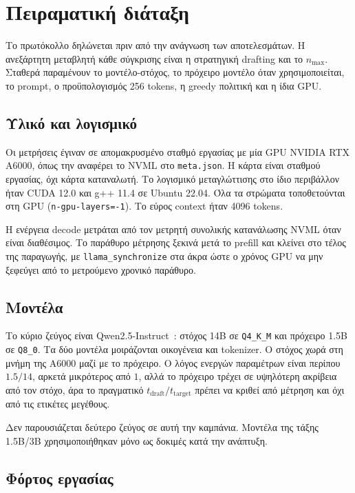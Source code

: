 \documentclass[a4paper,12pt]{report}
\theoremstyle{plain}
\theoremstyle{definition}
\theoremstyle{remark}
\begin{document}
\chapter{Πειραματική διάταξη}
\label{ch:setup}

Το πρωτόκολλο δηλώνεται πριν από την ανάγνωση των αποτελεσμάτων. Η ανεξάρτητη
μεταβλητή κάθε σύγκρισης είναι η στρατηγική drafting και το \(n_{\max}\).
Σταθερά παραμένουν το μοντέλο-στόχος, το πρόχειρο μοντέλο όταν χρησιμοποιείται,
το prompt, ο προϋπολογισμός 256 tokens, η greedy πολιτική και η ίδια GPU.

\section{Υλικό και λογισμικό}
\label{sec:hardware}

Οι μετρήσεις έγιναν σε απομακρυσμένο σταθμό εργασίας με μία GPU NVIDIA RTX
A6000, όπως την αναφέρει το NVML στο \texttt{meta.json}. Η κάρτα είναι
σταθμού εργασίας, όχι κάρτα καταναλωτή. Το λογισμικό μεταγλώττισης στο ίδιο
περιβάλλον ήταν CUDA 12.0 και g++ 11.4 σε Ubuntu 22.04. Όλα τα στρώματα
τοποθετούνται στη GPU (\texttt{n-gpu-layers=-1}). Το εύρος context ήταν 4096
tokens.

Η ενέργεια decode μετράται από τον μετρητή συνολικής κατανάλωσης NVML όταν
είναι διαθέσιμος. Το παράθυρο μέτρησης ξεκινά μετά το prefill και κλείνει
στο τέλος της παραγωγής, με \texttt{llama\_synchronize} στα άκρα ώστε ο
χρόνος GPU να μην ξεφεύγει από το μετρούμενο χρονικό παράθυρο.

\section{Μοντέλα}

Το κύριο ζεύγος είναι Qwen2.5-Instruct~\cite{qwen2p5}: στόχος 14B σε
\texttt{Q4\_K\_M} και πρόχειρο 1.5B σε \texttt{Q8\_0}. Τα δύο μοντέλα
μοιράζονται οικογένεια και tokenizer. Ο στόχος χωρά στη μνήμη της A6000 μαζί
με το πρόχειρο. Ο λόγος ενεργών παραμέτρων είναι περίπου \(1.5/14\), αρκετά
μικρότερος από \(1\), αλλά το πρόχειρο τρέχει σε υψηλότερη ακρίβεια από τον
στόχο, άρα το πραγματικό \(t_{\mathrm{draft}}/t_{\mathrm{target}}\) πρέπει να
κριθεί από μέτρηση και όχι από τις ετικέτες μεγέθους.

Δεν παρουσιάζεται δεύτερο ζεύγος σε αυτή την καμπάνια. Μοντέλα της τάξης
1.5B/3B χρησιμοποιήθηκαν μόνο ως δοκιμές κατά την ανάπτυξη.

\section{Φόρτος εργασίας}
\end{document}
